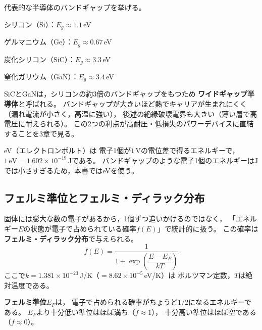 代表的な半導体のバンドギャップを挙げる。

\begin{箇条書}
\item シリコン（Si）：$E_g \approx 1.1$\,eV
\item ゲルマニウム（Ge）：$E_g \approx 0.67$\,eV
\item 炭化シリコン（SiC）：$E_g \approx 3.3$\,eV
\item 窒化ガリウム（GaN）：$E_g \approx 3.4$\,eV
\end{箇条書}

SiCとGaNは，シリコンの約3倍のバンドギャップをもつため
\textbf{ワイドギャップ半導体}と呼ばれる。
バンドギャップが大きいほど熱でキャリアが生まれにくく（漏れ電流が小さく，高温に強い），
後述の絶縁破壊電界も大きい（薄い層で高電圧に耐えられる）。
この2つの利点が高耐圧・低損失のパワーデバイスに直結することを3章で見る。

\begin{注意}
eV（エレクトロンボルト）は
電子1個が$1$\,Vの電位差で得るエネルギーで，
$1\,\mathrm{eV} = 1.602\times10^{-19}$\,Jである。
バンドギャップのような電子1個のエネルギーはJでは小さすぎるため，本書ではeVを使う。
\end{注意}

\subsection{フェルミ準位とフェルミ・ディラック分布}

固体には膨大な数の電子があるから，1個ずつ追いかけるのではなく，
「エネルギー$E$の状態が電子で占められている確率$f(E)$」で統計的に扱う。
この確率は\textbf{フェルミ・ディラック分布}で与えられる。
\begin{equation}
f(E) = \frac{1}{1 + \exp\left(\dfrac{E - E_F}{kT}\right)}
\label{eq1.2}
\end{equation}
ここで$k = 1.381\times10^{-23}$\,J/K（$= 8.62\times10^{-5}$\,eV/K）は
ボルツマン定数，$T$は絶対温度である。

\begin{定義}[フェルミ準位]
\label{def1.2}
\textbf{フェルミ準位}$E_F$は，
電子で占められる確率がちょうど$1/2$になるエネルギーである。
$E_F$より十分低い準位はほぼ満ち（$f \approx 1$），
十分高い準位はほぼ空である（$f \approx 0$）。
\end{定義}

